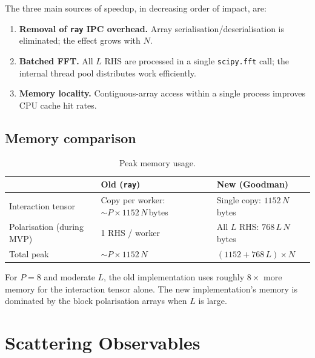 \documentclass[11pt,a4paper]{article}
\begin{document}
The three main sources of speedup, in decreasing order of impact, are:
\begin{enumerate}
\item \textbf{Removal of \texttt{ray} IPC overhead.}
      Array serialisation/deserialisation is eliminated; the effect
      grows with $N$.
\item \textbf{Batched FFT.}
      All $L$ RHS are processed in a single \texttt{scipy.fft} call;
      the internal thread pool distributes work efficiently.
\item \textbf{Memory locality.}
      Contiguous-array access within a single process improves CPU
      cache hit rates.
\end{enumerate}

\subsection{Memory comparison}
\label{sec:memory-compare}

\begin{table}[htbp]
\centering
\caption{Peak memory usage.}
\label{tab:memory-compare}
\begin{tabular}{@{}lll@{}}
\toprule
  & Old (\texttt{ray}) & New (Goodman) \\
\midrule
Interaction tensor
  & Copy per worker: $\sim P \times 1152\,N$\,bytes
  & Single copy: $1152\,N$\,bytes \\
Polarisation (during MVP)
  & 1 RHS / worker
  & All $L$ RHS: $768\,L\,N$\,bytes \\
Total peak
  & $\sim P \times 1152\,N$
  & $(1152 + 768\,L) \times N$ \\
\bottomrule
\end{tabular}
\end{table}

For $P = 8$ and moderate $L$, the old implementation uses roughly
$8\times$ more memory for the interaction tensor alone.
The new implementation's memory is dominated by the block polarisation
arrays when $L$ is large.

\section{Scattering Observables}
\label{sec:observables}
\end{document}
